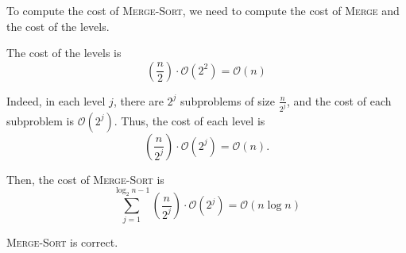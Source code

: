 To compute the cost of \textsc{Merge-Sort}, we need to compute the cost of \textsc{Merge} and the cost of the levels. 

\begin{claim}
    The cost of the levels is \[
        \left( \frac{n}{2} \right) \cdot \mathcal{O}(2^2) = \mathcal{O}(n)
    \]
\end{claim}

Indeed, in each level $j$, there are $2^j$ subproblems of size $\frac{n}{2^j}$, and the cost of each subproblem is $\mathcal{O}(2^j)$. Thus, the cost of each level is \[
    \left( \frac{n}{2^j} \right) \cdot \mathcal{O}(2^j) = \mathcal{O}(n).
\]

Then, the cost of \textsc{Merge-Sort} is \[
    \sum_{j=1}^{\log_2 n - 1} \left( \frac{n}{2^j} \right) \cdot \mathcal{O}(2^j) = \mathcal{O}(n \log n)
\]

\begin{claim}
    \textsc{Merge-Sort} is correct.
\end{claim}




